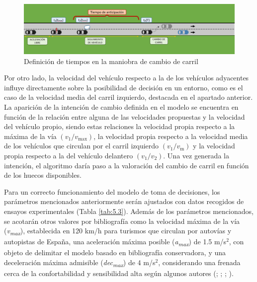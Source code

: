 \begin{figure}[h]
    \centering
    \includegraphics[width=15cm]
    {figures/5.2.png}
    \caption{ \label{fig:5.2} Definición de tiempos en la maniobra de cambio de carril }
\end{figure}

Por otro lado, la velocidad del vehículo respecto a la de los vehículos adyacentes influye directamente sobre la posibilidad de decisión en un entorno, como es el caso de la velocidad media del carril izquierdo, destacada en el apartado anterior. La aparición de la intención de cambio definida en el modelo se encuentra en función de la relación entre alguna de las velocidades propuestas y la velocidad del vehículo propio, siendo estas relaciones la velocidad propia respecto a la máxima de la vía $(v_1/v_{\text{max}})$, la velocidad propia respecto a la velocidad media de los vehículos que circulan por el carril izquierdo $(v_1/v_{\text{m}})$ y la velocidad propia respecto a la del vehículo delantero $(v_1/v_2)$. Una vez generada la intención, el algoritmo daría paso a la valoración del cambio de carril en función de los huecos disponibles. 

Para un correcto funcionamiento del modelo de toma de decisiones, los parámetros mencionados anteriormente serán ajustados con datos recogidos de ensayos experimentales (Tabla \ref{tab:5.3}). Además de los parámetros mencionados, se acotarán otros valores por bibliografía como la velocidad máxima de la vía (\emph{v\textsubscript{max}}), establecida en 120 km/h para turismos que circulan por autovías y autopistas de España, una aceleración máxima posible (\emph{a\textsubscript{max}}) de 1.5 m/s$^2$, con objeto de delimitar el modelo basado en bibliografía conservadora, y una deceleración máxima admisible (\emph{dec\textsubscript{max}}) de 4 m/s$^2$, considerando una frenada cerca de la confortabilidad y sensibilidad alta según algunos autores (\cite{vanarem}; \cite{gartner}; \cite{burgett01}; \cite{naujoks18}).  

